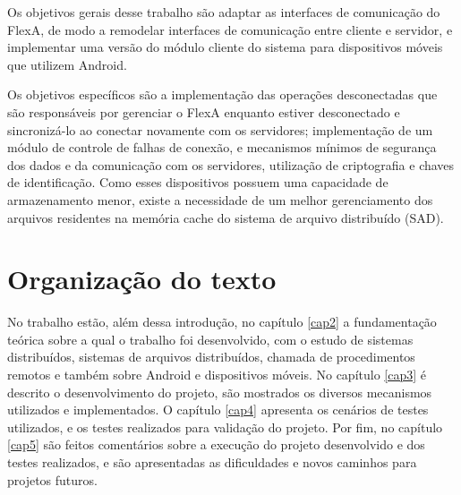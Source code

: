     Os objetivos gerais desse trabalho são adaptar as interfaces de comunicação do FlexA, de modo a remodelar interfaces de comunicação entre cliente e servidor, e implementar uma versão do módulo cliente do sistema para dispositivos móveis que utilizem Android.

    Os objetivos específicos são a implementação das operações desconectadas que são responsáveis por gerenciar o FlexA enquanto estiver desconectado e sincronizá-lo ao conectar novamente com os servidores; implementação de um módulo de controle de falhas de conexão, e mecanismos mínimos de segurança dos dados e da comunicação com os servidores, utilização de criptografia e chaves de identificação. Como esses dispositivos possuem uma capacidade de armazenamento menor, existe a necessidade de um melhor gerenciamento dos arquivos residentes na memória cache do sistema de arquivo distribuído (SAD).

\section{Organização do texto}

    No trabalho estão, além dessa introdução, no capítulo \ref{cap2} a fundamentação teórica sobre a qual o trabalho foi desenvolvido, com o estudo de sistemas distribuídos, sistemas de arquivos distribuídos, chamada de procedimentos remotos e também sobre Android e dispositivos móveis. No capítulo \ref{cap3} é descrito o desenvolvimento do projeto, são mostrados os diversos mecanismos utilizados e implementados. O capítulo \ref{cap4} apresenta os cenários de testes utilizados, e os testes realizados para validação do projeto. Por fim, no capítulo \ref{cap5} são feitos comentários sobre a execução do projeto desenvolvido e dos testes realizados, e são apresentadas as dificuldades e novos caminhos para projetos futuros.
    